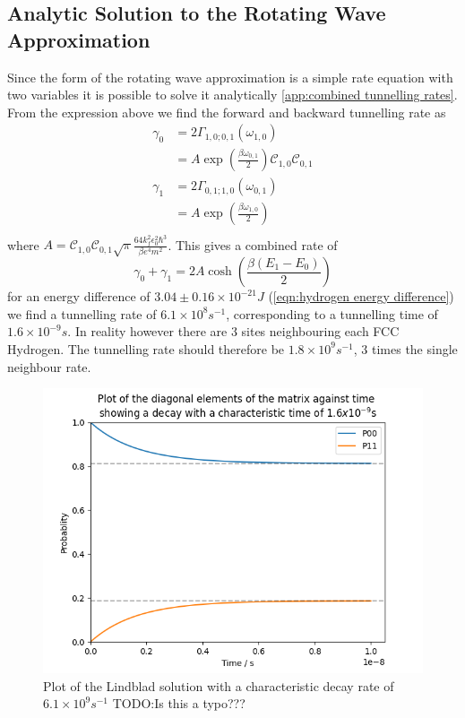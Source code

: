 \subsection{Analytic Solution to the Rotating Wave Approximation}
Since the form of the rotating
wave approximation is a simple
rate equation with two variables
it is possible to solve it analytically
\cref{app:combined tunnelling rates}.
From the expression above we find the
forward and backward tunnelling rate as
\begin{align}
    \gamma_0 & = 2\Gamma_{1,0;0, 1}(\omega_{1,0})       \\
             & = A \exp{(\frac{\beta \omega_{0,1}}{2})}
    \mathcal{C}_{1,0} \mathcal{C}_{0,1}                 \\
    \gamma_1 & = 2\Gamma_{0,1;1, 0}(\omega_{0,1})       \\
             & = A \exp{(\frac{\beta \omega_{1,0}}{2})} \\
\end{align}
where
\(A =
\mathcal{C}_{1,0} \mathcal{C}_{0,1}
\sqrt{\pi}
\frac{64 k_f^2 \epsilon_0^2 \hbar^3}{\beta e^4 m^2}\).
This gives a combined rate of
\begin{equation}
    \gamma_0 + \gamma_1 = 2A\cosh{(\frac{\beta (E_1 - E_0)}{2})}
    \label{eqn:theoretical rate lindblad equation}
\end{equation}
for an energy difference of
\(3.04\pm0.16\times{}10^{-21} J\)
(\cref{eqn:hydrogen energy difference})
we find a tunnelling rate of
\(6.1\times{}10^{8}s^{-1}\),
corresponding to a
tunnelling time of
\(1.6\times{}10^{-9}s\).
In reality however there
are 3 sites neighbouring
each FCC Hydrogen. The tunnelling
rate should therefore be
\(1.8\times{}10^{9}s^{-1}\),
\(3\) times the single
neighbour rate.


\begin{figure}
    \centering
    \includegraphics[width=.5\linewidth]{Figures/Redfield/Plot of lindblad solution.png}
    \caption{Plot of the Lindblad solution with a characteristic decay
    rate of \(6.1\times{}10^{9}s^{-1}\) TODO:Is this a typo???}
\end{figure}

